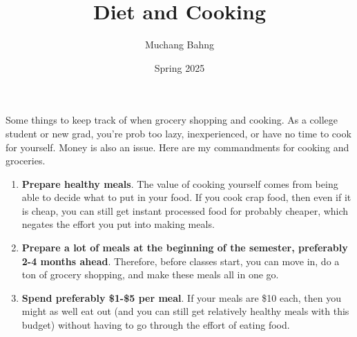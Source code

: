 \documentclass{article}
\begin{document}
\title{Diet and Cooking}
\author{Muchang Bahng}
\date{Spring 2025}

\maketitle

Some things to keep track of when grocery shopping and cooking. As a college student or new grad, you're prob too lazy, inexperienced, or have no time to cook for yourself. Money is also an issue. Here are my commandments for cooking and groceries. 
\begin{enumerate}
  \item \textbf{Prepare healthy meals}. The value of cooking yourself comes from being able to decide what to put in your food. If you cook crap food, then even if it is cheap, you can still get instant processed food for probably cheaper, which negates the effort you put into making meals.  
  \item \textbf{Prepare a lot of meals at the beginning of the semester, preferably 2-4 months ahead}. Therefore, before classes start, you can move in, do a ton of grocery shopping, and make these meals all in one go. 
  \item \textbf{Spend preferably \$1-\$5 per meal}. If your meals are \$10 each, then you might as well eat out (and you can still get relatively healthy meals with this budget) without having to go through the effort of eating food. 
\end{enumerate}
\end{document}
